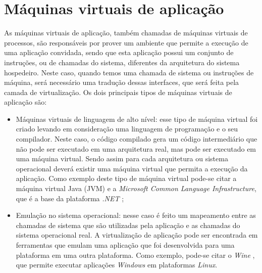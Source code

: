\section{Máquinas virtuais de aplicação}
\label{section:virtaplicacao}

As máquinas virtuais de aplicação, também chamadas de máquinas virtuais de processos, são responsáveis por prover um ambiente que permite 
a execução de uma aplicação convidada, sendo que esta aplicação possui um conjunto de instruções, ou de chamadas do sistema, diferentes da 
arquitetura do sistema hospedeiro. Neste caso, quando temos uma chamada de sistema ou instruções de máquina, será necessário uma 
tradução dessas interfaces, que será feita pela camada de virtualização. Os dois principais tipos de máquinas virtuais de aplicação são:

\begin{itemize}
 \item Máquinas virtuais de linguagem de alto nível: esse tipo de máquina virtual foi criado levando em consideração uma linguagem de 
 programação e o seu compilador. Neste caso, o código compilado gera um código intermediário que não pode ser executado em uma arquitetura real, 
 mas pode ser executado em uma máquina virtual. Sendo assim para cada arquitetura ou sistema operacional deverá existir uma máquina virtual que
 permita a execução da aplicação. Como exemplo deste tipo de máquina virtual pode-se citar a máquina virtual Java (\ac{JVM})
 e a \textit{Microsoft Common Language Infrastructure}, que é a base da plataforma \textit{.NET} \cite{carissimi2008};
 \item Emulação no sistema operacional: nesse caso é feito um mapeamento entre as chamadas de sistema que são utilizadas pela aplicação 
 e as chamadas do sistema operacional real. A virtualização de aplicação pode ser encontrada em ferramentas que emulam uma aplicação que foi
 desenvolvida para uma plataforma em uma outra plataforma. Como exemplo, pode-se citar o \textit{Wine} \cite{wine}, que permite executar 
 aplicações \textit{Windows} em plataformas \textit{Linux}.
\end{itemize}


